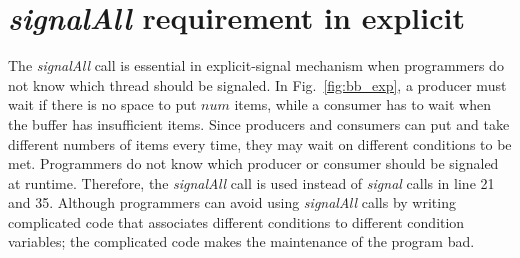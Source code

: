 \documentclass{sigplanconf}
\begin{document}

\section{{\em signalAll} requirement in explicit} 
\label{sec:sigAll}
The {\em signalAll} call is essential in explicit-signal mechanism when programmers
do not know which thread should be signaled. In Fig.~\ref{fig:bb_exp}, a 
producer must wait if there is no space to put $num$ items, while a consumer 
has to wait when the buffer has insufficient items.
Since producers and consumers can put and take different numbers of items
every time, they may wait on different conditions to be met. Programmers 
do not know which producer or consumer should be signaled at runtime. 
Therefore, the {\em signalAll} call is used instead of {\em signal} calls in
line 21 and 35.
Although programmers can avoid using {\em signalAll} calls by writing
complicated code that associates different conditions to different condition 
variables; the complicated code makes the maintenance of the program
bad. 

\end{document}
